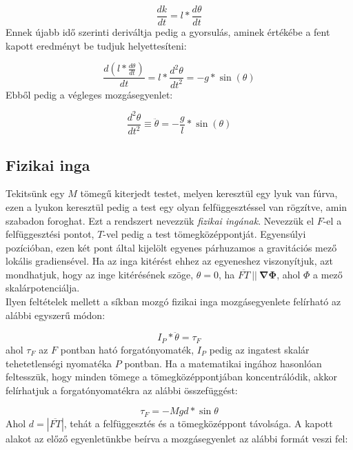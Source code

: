 \begin{multicols}{2}
\begin{equation}
    \frac{d k}{dt} = l * \frac{d \theta}{dt}
\end{equation}
Ennek újabb idő szerinti deriváltja pedig a gyorsulás, aminek értékébe a fent kapott eredményt be tudjuk helyettesíteni:

\begin{equation}
    \frac{d \left(l * \frac{d \theta}{dt} \right)}{dt}
    =
    l * \frac{d^{2} \theta}{dt^{2}}
    =
    -g * \sin{\left( \theta \right)}
\end{equation}
Ebből pedig a végleges mozgásegyenlet:

\begin{equation}
    \boxed{
    \frac{d^{2} \theta}{dt^{2}}
    \equiv
    \ddot{\theta}
    =
    - \frac{g}{l} * \sin{\left( \theta \right)}
    }
\end{equation}

\subsection{Fizikai inga} \label{sub:2.2}
Tekitsünk egy $M$ tömegű kiterjedt testet, melyen keresztül egy lyuk van fúrva, ezen a lyukon keresztül pedig a test egy olyan felfüggesztéssel van rögzítve, amin szabadon foroghat. Ezt a rendszert nevezzük \emph{fizikai ingának}. Nevezzük el $F$-el a felfüggesztési pontot, $T$-vel pedig a test tömegközéppontját. Egyensúlyi pozícióban, ezen két pont által kijelölt egyenes párhuzamos a gravitációs mező lokális gradiensével. Ha az inga kitérést ehhez az egyeneshez viszonyítjuk, azt mondhatjuk, hogy az inge kitérésének szöge, $\theta = 0$, ha $\overline{FT}\ ||\ \boldsymbol{\nabla} \boldsymbol{\Phi}$, ahol $\Phi$ a mező skalárpotenciálja. \\
Ilyen feltételek mellett a síkban mozgó fizikai inga mozgásegyenlete felírható az alábbi\cite{physpend} egyszerű módon:

\begin{equation}
    I_{P} * \ddot{\theta}
    =
    \tau_{F}
\end{equation}
ahol $\tau_{F}$ az $F$ pontban ható forgatónyomaték, $I_{P}$ pedig az ingatest skalár tehetetlenségi nyomatéka $P$ pontban. Ha a matematikai ingához hasonlóan feltesszük, hogy minden tömege a tömegközéppontjában koncentrálódik, akkor felírhatjuk a forgatónyomatékra az alábbi összefüggést:

\begin{equation}
    \tau_{F}
    =
    - M g d * \sin{\theta}
\end{equation}
Ahol $d = \left| \overline{FT} \right|$, tehát a felfüggesztés és a tömegközéppont távolsága. A kapott alakot az előző egyenletünkbe beírva a mozgásegyenlet az alábbi formát veszi fel:


\end{multicols}
